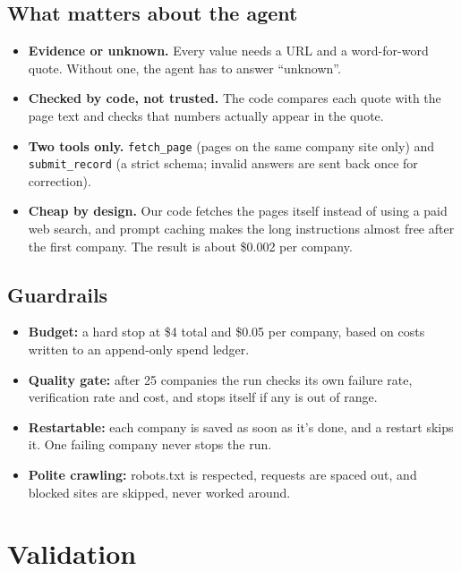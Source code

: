 \documentclass[11pt,a4paper]{article}
\newcommand{\code}[1]{\texttt{#1}}
\begin{document}
\subsection{What matters about the agent}
\begin{itemize}
  \item \textbf{Evidence or unknown.} Every value needs a URL and a word-for-word quote. Without
        one, the agent has to answer ``unknown''.
  \item \textbf{Checked by code, not trusted.} The code compares each quote with the page text and
        checks that numbers actually appear in the quote.
  \item \textbf{Two tools only.} \code{fetch\_page} (pages on the same company site only) and
        \code{submit\_record} (a strict schema; invalid answers are sent back once for correction).
  \item \textbf{Cheap by design.} Our code fetches the pages itself instead of using a paid web
        search, and prompt caching makes the long instructions almost free after the first
        company. The result is about \$0.002 per company.
\end{itemize}

\subsection{Guardrails}
\begin{itemize}
  \item \textbf{Budget:} a hard stop at \$4 total and \$0.05 per company, based on costs
        written to an append-only spend ledger.
  \item \textbf{Quality gate:} after 25 companies the run checks its own failure rate,
        verification rate and cost, and stops itself if any is out of range.
  \item \textbf{Restartable:} each company is saved as soon as it's done, and a restart skips it.
        One failing company never stops the run.
  \item \textbf{Polite crawling:} robots.txt is respected, requests are spaced out, and blocked
        sites are skipped, never worked around.
\end{itemize}

\section{Validation}
\end{document}

